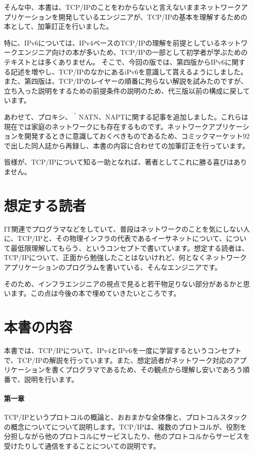 そんな中、本書は、TCP/IPのことをわからないと言えないままネットワークアプリケーションを開発しているエンジニアが、TCP/IPの基本を理解するための本として、加筆訂正を行いました。

特に、IPv6については、IPv4ベースのTCP/IPの理解を前提としているネットワークエンジニア向けの本が多いため、TCP/IPの一部として初学者が学ぶためのテキストとは多くありません。
そこで、今回の版では、第四版からIPv6に関する記述を増やし、TCP/IPのなかにあるiPv6を意識して貰えるようにしました。
また、第四版は、TCP/IPのレイヤーの順番に拘らない解説を試みたのですが、立ち入った説明をするための前提条件の説明のため、代三版以前の構成に戻しています。

あわせて、プロキシ、｀NATN、NAPTに関する記事を追加しました。これらは現在では家庭のネットワークにも存在するものです。ネットワークアプリケーションを開発するときに意識しておくべきものであるため、コミックマーケット92で出した同人誌から再録し、本書の内容に合わせての加筆訂正を行っています。

皆様が、TCP/IPについて知る一助となれば、著者としてこれに勝る喜びはありません。

\section*{想定する読者}
IT関連でプログラマなどをしていて、普段はネットワークのことを気にしない人に、TCP/IPと、その物理インフラの代表であるイーサネットについて、について最低限理解してもらう、というコンセプトで書いています。想定する読者は、TCP/IPについて、正面から勉強したことはないけれど、何となくネットワークアプリケーションのプログラムを書いている、そんなエンジニアです。

そのため、インフラエンジニアの視点で見ると若干物足りない部分があるかと思います。この点は今後の本で埋めていきたいところです。


\section*{本書の内容}
本書では、TCP/IPについて、IPv4とIPv6を一度に学習するというコンセプトで、TCP/IPの解説を行っています。また、想定読者がネットワーク対応のアプリケーションを書くプログラマであるため、その観点から理解し安いであろう順番で、説明を行います。

\paragraph{第一章}
TCP/IPというプロトコルの概論と、おおまかな全体像と、プロトコルスタックの概念についてについて説明します。TCP/IPは、複数のプロトコルが、役割を分担しながら他のプロトコルにサービスしたり、他のプロトコルからサービスを受けたりして通信をすることについての説明です。

